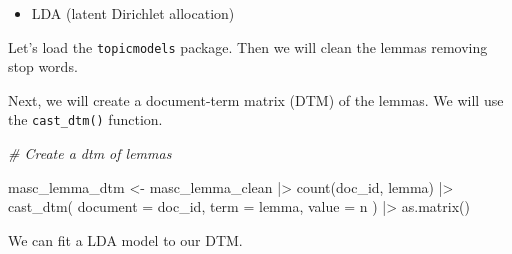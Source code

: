 \documentclass[
  letterpaper,
  DIV=11,
  numbers=noendperiod]{scrreport}
\newenvironment{Shaded}{\begin{snugshade}}{\end{snugshade}}
\newcommand{\AttributeTok}[1]{\textcolor[rgb]{0.00,0.00,0.00}{#1}}
\newcommand{\CommentTok}[1]{\textcolor[rgb]{0.00,0.00,0.00}{\textit{#1}}}
\newcommand{\FunctionTok}[1]{\textcolor[rgb]{0.00,0.00,0.00}{#1}}
\newcommand{\NormalTok}[1]{\textcolor[rgb]{0.00,0.00,0.00}{#1}}
\newcommand{\OtherTok}[1]{\textcolor[rgb]{0.00,0.00,0.00}{#1}}
\newcommand{\SpecialCharTok}[1]{\textcolor[rgb]{0.00,0.00,0.00}{#1}}
\providecommand{\tightlist}{%
  \setlength{\itemsep}{0pt}\setlength{\parskip}{0pt}}\usepackage{longtable,booktabs,array}
\theoremstyle{definition}
\theoremstyle{remark}
\begin{document}
\begin{itemize}
\tightlist
\item
  LDA (latent Dirichlet allocation)
\end{itemize}

Let's load the \texttt{topicmodels} package. Then we will clean the
lemmas removing stop words.

\begin{Shaded}
\end{Shaded}

Next, we will create a document-term matrix (DTM) of the lemmas. We will
use the \texttt{cast\_dtm()} function.

\begin{Shaded}
\begin{Highlighting}[]
\CommentTok{\# Create a dtm of lemmas}

\NormalTok{masc\_lemma\_dtm }\OtherTok{\textless{}{-}} 
\NormalTok{  masc\_lemma\_clean }\SpecialCharTok{|\textgreater{}} 
  \FunctionTok{count}\NormalTok{(doc\_id, lemma) }\SpecialCharTok{|\textgreater{}} 
  \FunctionTok{cast\_dtm}\NormalTok{(}
    \AttributeTok{document =}\NormalTok{ doc\_id,}
    \AttributeTok{term =}\NormalTok{ lemma,}
    \AttributeTok{value =}\NormalTok{ n}
\NormalTok{  ) }\SpecialCharTok{|\textgreater{}} 
  \FunctionTok{as.matrix}\NormalTok{()}
\end{Highlighting}
\end{Shaded}

We can fit a LDA model to our DTM.
\end{document}
